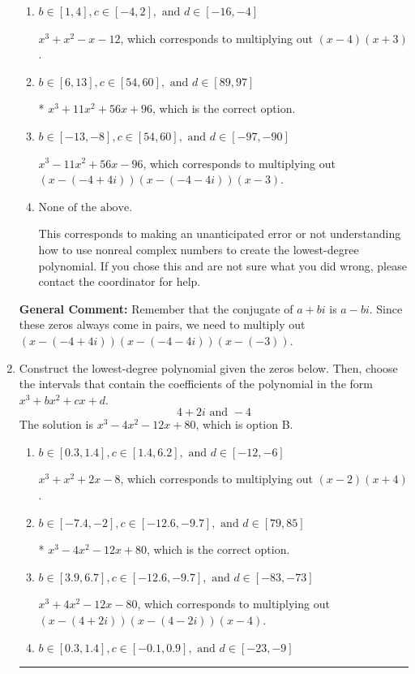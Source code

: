 \documentclass{extbook}[14pt]
\newcommand{\litem}[1]{\item #1

\rule{\textwidth}{0.4pt}}
\begin{document}
\begin{enumerate}
{\begin{enumerate}[label=\Alph*.]
$x^{3} + x^{2} +7 x + 12$, which corresponds to multiplying out $(x + 4)(x + 3)$.
\item \( b \in [1, 4], c \in [-4, 2], \text{ and } d \in [-16, -4] \)

$x^{3} + x^{2} -x -12$, which corresponds to multiplying out $(x -4)(x + 3)$.
\item \( b \in [6, 13], c \in [54, 60], \text{ and } d \in [89, 97] \)

* $x^{3} +11 x^{2} +56 x + 96$, which is the correct option.
\item \( b \in [-13, -8], c \in [54, 60], \text{ and } d \in [-97, -90] \)

$x^{3} -11 x^{2} +56 x -96$, which corresponds to multiplying out $(x-(-4 + 4 i))(x-(-4 - 4 i))(x -3)$.
\item \( \text{None of the above.} \)

This corresponds to making an unanticipated error or not understanding how to use nonreal complex numbers to create the lowest-degree polynomial. If you chose this and are not sure what you did wrong, please contact the coordinator for help.
\end{enumerate}

\textbf{General Comment:} Remember that the conjugate of $a+bi$ is $a-bi$. Since these zeros always come in pairs, we need to multiply out $(x-(-4 + 4 i))(x-(-4 - 4 i))(x-(-3))$.
}
\litem{
Construct the lowest-degree polynomial given the zeros below. Then, choose the intervals that contain the coefficients of the polynomial in the form $x^3+bx^2+cx+d$.
\[ 4 + 2 i \text{ and } -4 \]The solution is \( x^{3} -4 x^{2} -12 x + 80 \), which is option B.\begin{enumerate}[label=\Alph*.]
\item \( b \in [0.3, 1.4], c \in [1.4, 6.2], \text{ and } d \in [-12, -6] \)

$x^{3} + x^{2} +2 x -8$, which corresponds to multiplying out $(x -2)(x + 4)$.
\item \( b \in [-7.4, -2], c \in [-12.6, -9.7], \text{ and } d \in [79, 85] \)

* $x^{3} -4 x^{2} -12 x + 80$, which is the correct option.
\item \( b \in [3.9, 6.7], c \in [-12.6, -9.7], \text{ and } d \in [-83, -73] \)

$x^{3} +4 x^{2} -12 x -80$, which corresponds to multiplying out $(x-(4 + 2 i))(x-(4 - 2 i))(x -4)$.
\item \( b \in [0.3, 1.4], c \in [-0.1, 0.9], \text{ and } d \in [-23, -9] \)


\end{enumerate}}
\end{enumerate}
\end{document}
